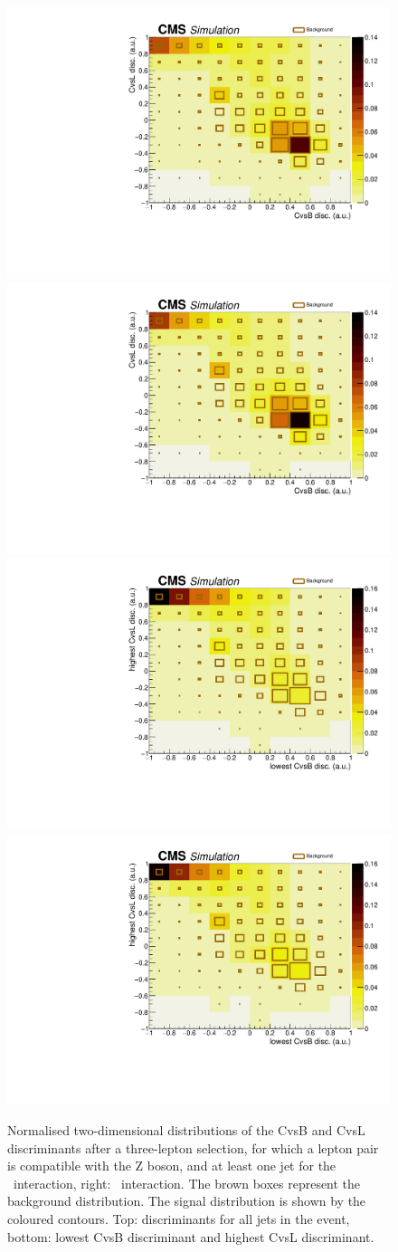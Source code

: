\begin{figure}[htbp] 
	\includegraphics[width=0.49\linewidth]{7_Conclusion/Figures/2dcharm/CvsBCvsLdiscZct}
	\includegraphics[width=0.49\linewidth]{7_Conclusion/Figures/2dcharm/CvsBCvsLdiscZut}
	\includegraphics[width=0.49\linewidth]{7_Conclusion/Figures/2dcharm/CvsBdiscLowCvsLdiscHighZct}
	\includegraphics[width=0.49\linewidth]{7_Conclusion/Figures/2dcharm/CvsBdiscLowCvsLdiscHighZut}
	\caption{Normalised two-dimensional distributions of the CvsB and CvsL discriminants after a three-lepton selection, for which a lepton pair is compatible with the Z boson, and at least one jet  for the \Zct\ interaction, right: \Zut\ interaction. The brown boxes represent the background distribution. The signal distribution is shown by the coloured contours.  Top: discriminants for all jets in the event, bottom: lowest CvsB discriminant and highest CvsL discriminant. }
	\label{fig:ctagg2d}
\end{figure}

